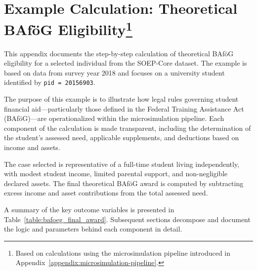 

\newpage
\section[Example Calculation: Theoretical BAföG Eligibility]{Example Calculation: Theoretical BAföG Eligibility\footnote{Based on calculations using the microsimulation pipeline introduced in Appendix~\ref{appendix:microsimulation-pipeline}.}}
\label{appendix:bafoeg-example}

This appendix documents the step-by-step calculation of theoretical BAföG eligibility for a selected individual from the SOEP-Core dataset. The example is based on data from survey year 2018 and focuses on a university student identified by \texttt{pid = 20156903}.

The purpose of this example is to illustrate how legal rules governing student financial aid—particularly those defined in the Federal Training Assistance Act (BAföG)—are operationalized within the microsimulation pipeline. Each component of the calculation is made transparent, including the determination of the student's assessed need, applicable supplements, and deductions based on income and assets.

The case selected is representative of a full-time student living independently, with modest student income, limited parental support, and non-negligible declared assets. The final theoretical BAföG award is computed by subtracting excess income and asset contributions from the total assessed need.

A summary of the key outcome variables is presented in Table~\ref{table:bafoeg_final_award}. Subsequent sections decompose and document the logic and parameters behind each component in detail.







